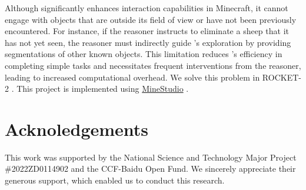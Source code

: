 \documentclass[11pt, a4paper, logo, two column]{craftjarvis}
\begin{document}
Although \agent significantly enhances interaction capabilities in Minecraft, it cannot engage with objects that are outside its field of view or have not been previously encountered. For instance, if the reasoner instructs \agent to eliminate a sheep that it has not yet seen, the reasoner must indirectly guide \agent’s exploration by providing segmentations of other known objects. This limitation reduces \agent’s efficiency in completing simple tasks and necessitates frequent interventions from the reasoner, leading to increased computational overhead. We solve this problem in ROCKET-2 \citep{rocket2}. 
This project is implemented using \href{https://github.com/CraftJarvis/MineStudio}{MineStudio} \citep{MineStudio}. 

\section{Acknoledgements}
This work was supported by the National Science and Technology Major Project \#2022ZD0114902 and the CCF-Baidu Open Fund. We sincerely appreciate their generous support, which enabled us to conduct this research. 


\clearpage


\end{document}
